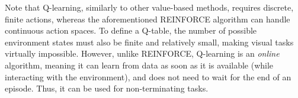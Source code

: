 Note that Q-learning, similarly to other value-based methods, requires discrete, finite actions, whereas the aforementioned REINFORCE algorithm can handle continuous action spaces. To define a Q-table, the number of possible environment states must also be finite and relatively small, making visual tasks virtually impossible. However, unlike REINFORCE, Q-learning is an \textit{online} algorithm, meaning it can learn from data as soon as it is available (while interacting with the environment), and does not need to wait for the end of an episode. Thus, it can be used for non-terminating tasks. \cite{bible}